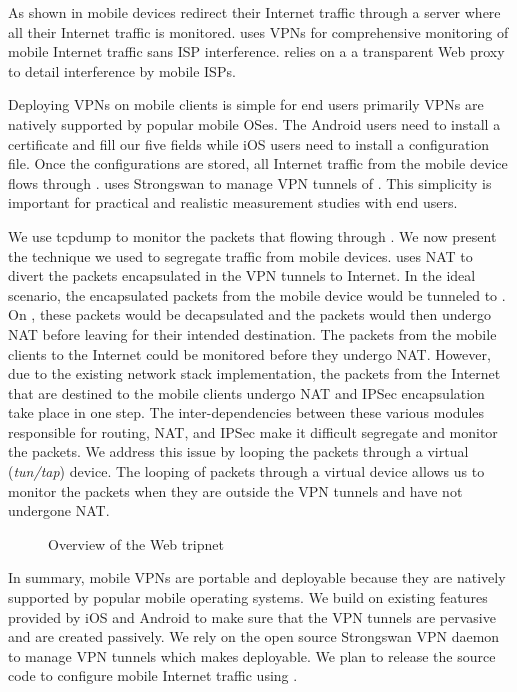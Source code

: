 As shown in  mobile devices redirect their Internet traffic through a \platname server where all their Internet traffic is monitored. 
\platname uses VPNs for comprehensive monitoring of mobile Internet traffic sans ISP interference.
\platname relies on a a transparent Web proxy to detail interference by mobile ISPs.

Deploying VPNs on mobile clients is simple for end users primarily VPNs are natively supported by popular mobile OSes. 
The Android users need to install a certificate and fill our five fields while iOS users need to install a configuration file. 
Once the configurations are stored, all Internet traffic from the mobile device flows through \platname. 
\platname uses Strongswan to manage VPN tunnels of \platname.
This simplicity is important for practical and realistic measurement studies with end users.

We use tcpdump to monitor the packets that flowing through \platname. 
We now present the technique we used to segregate traffic from mobile devices. 
\platname uses NAT to divert the packets encapsulated in the VPN tunnels to Internet. 
In the ideal scenario, the encapsulated packets from the mobile device would be tunneled to \platname. 
On \platname, these packets would be decapsulated and the packets would then undergo NAT before leaving for their intended destination. 
The packets from the mobile clients to the Internet could be monitored before they undergo NAT.
However, due to the existing network stack implementation, the packets from the Internet that are destined to the mobile clients undergo NAT and IPSec encapsulation take place in one step.
The inter-dependencies between these various modules responsible for routing, NAT, and IPSec make it difficult segregate and monitor the packets. 
We address this issue by looping the packets through a virtual (\emph{tun/tap}) device. 
The looping of packets through a virtual device allows us to monitor the packets when they are outside the VPN tunnels and have not undergone NAT. 

\begin{figure}
\centering
{} 
\caption{Overview of the Web tripnet }
\label{fig:tripnet}
\end{figure}


In summary, mobile VPNs are portable and deployable because they are natively supported by popular mobile operating systems.
We build on existing features provided by iOS and Android to make sure that the VPN tunnels are pervasive and are created passively. 
We rely on the open source Strongswan VPN daemon to manage VPN tunnels which makes \platname deployable.
We plan to release the source code to configure mobile Internet traffic using  \platname.

